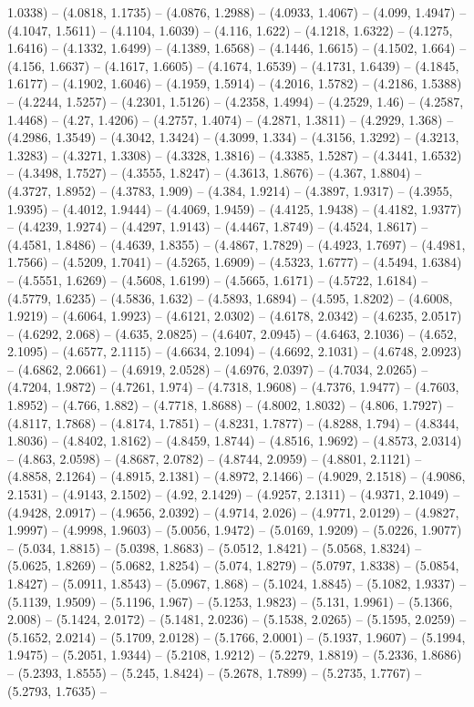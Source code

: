 1.0338) -- (4.0818, 1.1735) -- (4.0876, 1.2988) -- (4.0933, 1.4067) -- (4.099, 1.4947) -- (4.1047, 1.5611) -- (4.1104, 1.6039) -- (4.116, 1.622) -- (4.1218, 1.6322) -- (4.1275, 1.6416) -- (4.1332, 1.6499) -- (4.1389, 1.6568) -- (4.1446, 1.6615) -- (4.1502, 1.664) -- (4.156, 1.6637) -- (4.1617, 1.6605) -- (4.1674, 1.6539) -- (4.1731, 1.6439) -- (4.1845, 1.6177) -- (4.1902, 1.6046) -- (4.1959, 1.5914) -- (4.2016, 1.5782) -- (4.2186, 1.5388) -- (4.2244, 1.5257) -- (4.2301, 1.5126) -- (4.2358, 1.4994) -- (4.2529, 1.46) -- (4.2587, 1.4468) -- (4.27, 1.4206) -- (4.2757, 1.4074) -- (4.2871, 1.3811) -- (4.2929, 1.368) -- (4.2986, 1.3549) -- (4.3042, 1.3424) -- (4.3099, 1.334) -- (4.3156, 1.3292) -- (4.3213, 1.3283) -- (4.3271, 1.3308) -- (4.3328, 1.3816) -- (4.3385, 1.5287) -- (4.3441, 1.6532) -- (4.3498, 1.7527) -- (4.3555, 1.8247) -- (4.3613, 1.8676) -- (4.367, 1.8804) -- (4.3727, 1.8952) -- (4.3783, 1.909) -- (4.384, 1.9214) -- (4.3897, 1.9317) -- (4.3955, 1.9395) -- (4.4012, 1.9444) -- (4.4069, 1.9459) -- (4.4125, 1.9438) -- (4.4182, 1.9377) -- (4.4239, 1.9274) -- (4.4297, 1.9143) -- (4.4467, 1.8749) -- (4.4524, 1.8617) -- (4.4581, 1.8486) -- (4.4639, 1.8355) -- (4.4867, 1.7829) -- (4.4923, 1.7697) -- (4.4981, 1.7566) -- (4.5209, 1.7041) -- (4.5265, 1.6909) -- (4.5323, 1.6777) -- (4.5494, 1.6384) -- (4.5551, 1.6269) -- (4.5608, 1.6199) -- (4.5665, 1.6171) -- (4.5722, 1.6184) -- (4.5779, 1.6235) -- (4.5836, 1.632) -- (4.5893, 1.6894) -- (4.595, 1.8202) -- (4.6008, 1.9219) -- (4.6064, 1.9923) -- (4.6121, 2.0302) -- (4.6178, 2.0342) -- (4.6235, 2.0517) -- (4.6292, 2.068) -- (4.635, 2.0825) -- (4.6407, 2.0945) -- (4.6463, 2.1036) -- (4.652, 2.1095) -- (4.6577, 2.1115) -- (4.6634, 2.1094) -- (4.6692, 2.1031) -- (4.6748, 2.0923) -- (4.6862, 2.0661) -- (4.6919, 2.0528) -- (4.6976, 2.0397) -- (4.7034, 2.0265) -- (4.7204, 1.9872) -- (4.7261, 1.974) -- (4.7318, 1.9608) -- (4.7376, 1.9477) -- (4.7603, 1.8952) -- (4.766, 1.882) -- (4.7718, 1.8688) -- (4.8002, 1.8032) -- (4.806, 1.7927) -- (4.8117, 1.7868) -- (4.8174, 1.7851) -- (4.8231, 1.7877) -- (4.8288, 1.794) -- (4.8344, 1.8036) -- (4.8402, 1.8162) -- (4.8459, 1.8744) -- (4.8516, 1.9692) -- (4.8573, 2.0314) -- (4.863, 2.0598) -- (4.8687, 2.0782) -- (4.8744, 2.0959) -- (4.8801, 2.1121) -- (4.8858, 2.1264) -- (4.8915, 2.1381) -- (4.8972, 2.1466) -- (4.9029, 2.1518) -- (4.9086, 2.1531) -- (4.9143, 2.1502) -- (4.92, 2.1429) -- (4.9257, 2.1311) -- (4.9371, 2.1049) -- (4.9428, 2.0917) -- (4.9656, 2.0392) -- (4.9714, 2.026) -- (4.9771, 2.0129) -- (4.9827, 1.9997) -- (4.9998, 1.9603) -- (5.0056, 1.9472) -- (5.0169, 1.9209) -- (5.0226, 1.9077) -- (5.034, 1.8815) -- (5.0398, 1.8683) -- (5.0512, 1.8421) -- (5.0568, 1.8324) -- (5.0625, 1.8269) -- (5.0682, 1.8254) -- (5.074, 1.8279) -- (5.0797, 1.8338) -- (5.0854, 1.8427) -- (5.0911, 1.8543) -- (5.0967, 1.868) -- (5.1024, 1.8845) -- (5.1082, 1.9337) -- (5.1139, 1.9509) -- (5.1196, 1.967) -- (5.1253, 1.9823) -- (5.131, 1.9961) -- (5.1366, 2.008) -- (5.1424, 2.0172) -- (5.1481, 2.0236) -- (5.1538, 2.0265) -- (5.1595, 2.0259) -- (5.1652, 2.0214) -- (5.1709, 2.0128) -- (5.1766, 2.0001) -- (5.1937, 1.9607) -- (5.1994, 1.9475) -- (5.2051, 1.9344) -- (5.2108, 1.9212) -- (5.2279, 1.8819) -- (5.2336, 1.8686) -- (5.2393, 1.8555) -- (5.245, 1.8424) -- (5.2678, 1.7899) -- (5.2735, 1.7767) -- (5.2793, 1.7635) -- 
